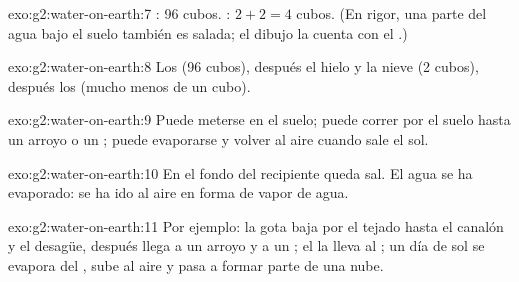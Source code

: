 \begin{solution}{exo:g2:water-on-earth:7}
: 96 cubos. : $2 + 2 = 4$ cubos.
(En rigor, una parte del agua bajo el suelo también es salada; el dibujo la
cuenta con el .)
\end{solution}

\begin{solution}{exo:g2:water-on-earth:8}
Los  (96 cubos), después el hielo y la nieve (2 cubos), después los
 (mucho menos de un cubo).
\end{solution}

\begin{solution}{exo:g2:water-on-earth:9}
Puede meterse en el suelo; puede correr por el suelo hasta un arroyo o un
; puede evaporarse y volver al aire cuando sale el sol.
\end{solution}

\begin{solution}{exo:g2:water-on-earth:10}
En el fondo del recipiente queda sal. El agua se ha evaporado: se ha ido al
aire en forma de vapor de agua.
\end{solution}

\begin{solution}{exo:g2:water-on-earth:11}
Por ejemplo: la gota baja por el tejado hasta el canalón y el desagüe,
después llega a un arroyo y a un ; el  la lleva al ; un día de sol
se evapora del , sube al aire y pasa a formar parte de una nube.
\end{solution}

